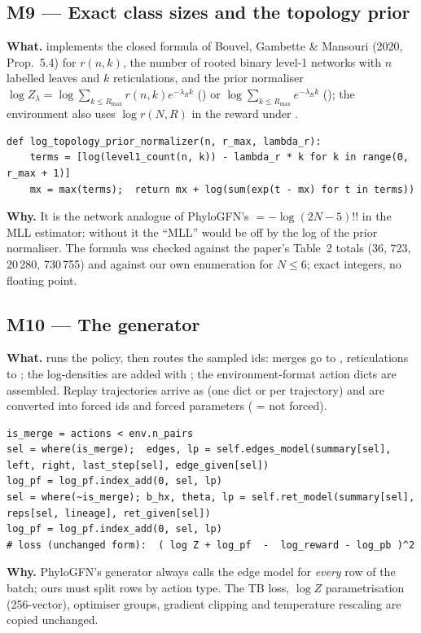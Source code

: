 \subsection{M9 --- Exact class sizes and the topology prior}
\textbf{What.}  implements the closed formula of Bouvel, Gambette \& Mansouri (2020, Prop.~5.4) for $r(n,k)$, the number of rooted binary level-1 networks with $n$ labelled leaves and $k$ reticulations, and the prior normaliser $\log Z_\lambda=\log\sum_{k\le R_{\max}}r(n,k)e^{-\lambda_Rk}$ () or $\log\sum_{k\le R_{\max}}e^{-\lambda_Rk}$ (); the environment also uses $\log r(N,R)$ in the reward under .
\begin{lstlisting}
def log_topology_prior_normalizer(n, r_max, lambda_r):
    terms = [log(level1_count(n, k)) - lambda_r * k for k in range(0, r_max + 1)]
    mx = max(terms);  return mx + log(sum(exp(t - mx) for t in terms))
\end{lstlisting}
\textbf{Why.} It is the network analogue of PhyloGFN's  $=-\log(2N-5)!!$ in the MLL estimator: without it the ``MLL'' would be off by the log of the prior normaliser. The formula was checked against the paper's Table~2 totals (36, 723, 20\,280, 730\,755) and against our own enumeration for $N\le6$; exact integers, no floating point.

\subsection{M10 --- The generator}
\textbf{What.}  runs the policy, then routes the sampled ids: merges go to , reticulations to ; the log-densities are added with ; the environment-format action dicts are assembled. Replay trajectories arrive as  (one dict or  per trajectory) and are converted into forced ids and forced parameters ( = not forced).
\begin{lstlisting}
is_merge = actions < env.n_pairs
sel = where(is_merge);  edges, lp = self.edges_model(summary[sel], left, right, last_step[sel], edge_given[sel])
log_pf = log_pf.index_add(0, sel, lp)
sel = where(~is_merge); b_hx, theta, lp = self.ret_model(summary[sel], reps[sel, lineage], ret_given[sel])
log_pf = log_pf.index_add(0, sel, lp)
# loss (unchanged form):  ( log Z + log_pf  -  log_reward - log_pb )^2
\end{lstlisting}
\textbf{Why.} PhyloGFN's generator always calls the edge model for \emph{every} row of the batch; ours must split rows by action type. The TB loss, $\log Z$ parametrisation (256-vector), optimiser groups, gradient clipping and temperature rescaling are copied unchanged.


